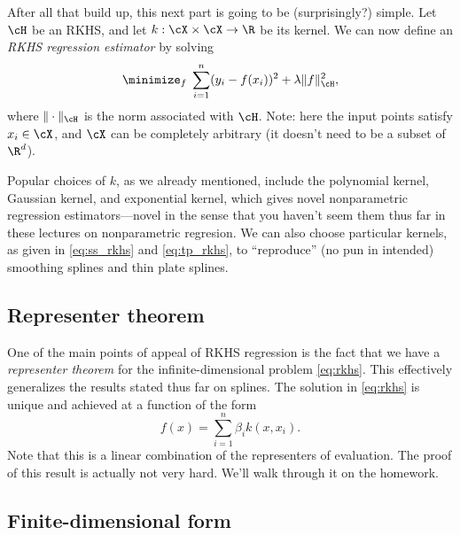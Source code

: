 \documentclass{article}
\begin{document}
After all that build up, this next part is going to be (surprisingly?)
simple. Let $\cH$ be an RKHS, and let $k : \cX \times \cX \to \R$ be its
kernel. We can now define an \emph{RKHS regression estimator} by solving 
\begin{equation}
\label{eq:rkhs}
\minimize_f \; \sum_{i=1}^n (y_i - f(x_i))^2 + \lambda \|f\|_\cH^2,
\end{equation}
where $\|\cdot\|_\cH$ is the norm associated with $\cH$. Note: here the input
points satisfy $x_i \in \cX$, and $\cX$ can be completely arbitrary (it doesn't
need to be a subset of $\R^d$). 

Popular choices of $k$, as we already mentioned, include the polynomial kernel,
Gaussian kernel, and exponential kernel, which gives novel nonparametric
regression estimators---novel in the sense that you haven't seem them thus far
in these lectures on nonparametric regresion. We can also choose particular
kernels, as given in \eqref{eq:ss_rkhs} and \eqref{eq:tp_rkhs}, to ``reproduce''
(no pun in intended) smoothing splines and thin plate splines. 


\subsection{Representer theorem}

One of the main points of appeal of RKHS regression is the fact that we have a
\emph{representer theorem} for the infinite-dimensional problem \eqref{eq:rkhs}.
This effectively generalizes the results stated thus far on splines. The
solution in \eqref{eq:rkhs} is unique and achieved at a function of the form   
\[
f(x) = \sum_{i=1}^n \beta_i k(x, x_i).
\]
Note that this is a linear combination of the representers of evaluation. The
proof of this result is actually not very hard. We'll walk through it on the
homework.  

\subsection{Finite-dimensional form}
\end{document}
